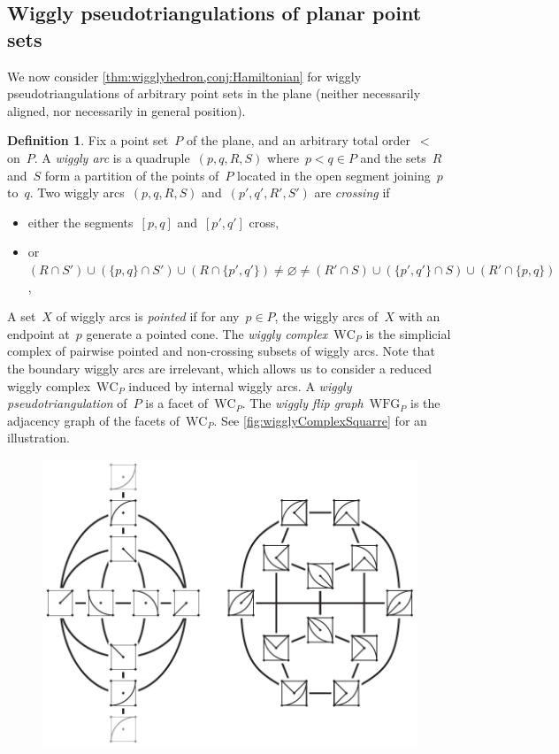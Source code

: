 \documentclass{amsart}
\theoremstyle{definition}
\newtheorem{definition}[theorem]{Definition}
\newcommand{\darkblue}{\color{darkblue}} %
\newcommand{\defn}[1]{\textsl{\darkblue #1}} %
\newcommand{\wigglyComplex}{\mathrm{WC}} %
\newcommand{\wigglyFlipGraph}{\mathrm{WFG}} %
\begin{document}

\subsection{Wiggly pseudotriangulations of planar point sets}
\label{subsec:planarPointSets}

We now consider \cref{thm:wigglyhedron,conj:Hamiltonian} for wiggly pseudotriangulations of arbitrary point sets in the plane (neither necessarily aligned, nor necessarily in general position).

\begin{definition}
\label{def:wigglyComplexPointSet}
Fix a point set~$P$ of the plane, and an arbitrary total order~$<$ on~$P$.
A \defn{wiggly arc} is a quadruple~$(p,q,R,S)$ where~$p < q \in P$ and the sets~$R$ and~$S$ form a partition of the points of~$P$ located in the open segment joining~$p$ to~$q$.
Two wiggly arcs~$(p,q,R,S)$ and~$(p',q',R',S')$ are \defn{crossing} if 
\begin{itemize}
\item either the segments~$[p,q]$ and~$[p',q']$ cross, 
\item or~$(R \cap S') \cup (\{p,q\} \cap S') \cup (R \cap \{p',q'\}) \ne \varnothing \ne (R' \cap S) \cup (\{p',q'\} \cap S) \cup (R' \cap \{p,q\})$,
\end{itemize}
A set~$X$ of wiggly arcs is \defn{pointed} if for any~$p \in P$, the wiggly arcs of~$X$ with an endpoint at~$p$ generate a pointed cone.
The \defn{wiggly complex}~$\wigglyComplex_P$ is the simplicial complex of pairwise pointed and non-crossing subsets of wiggly arcs.
Note that the boundary wiggly arcs are irrelevant, which allows us to consider a reduced wiggly complex~$\wigglyComplex_P$ induced by internal wiggly arcs.
A \defn{wiggly pseudotriangulation} of~$P$ is a facet of~$\wigglyComplex_P$.
The \defn{wiggly flip graph}~$\wigglyFlipGraph_P$ is the adjacency graph of the facets of~$\wigglyComplex_P$.
See \cref{fig:wigglyComplexSquarre} for an illustration.
%
\begin{figure}[!h]
\centerline{\includegraphics[scale=1]{wigglyComplexSquare}}

\end{figure}
\end{definition}
\end{document}
